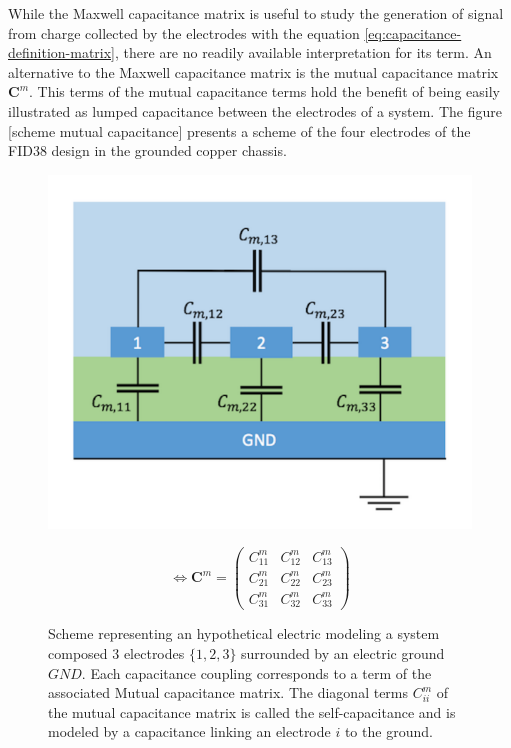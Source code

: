 While the Maxwell capacitance matrix is useful to study the generation of signal from charge collected by the electrodes with the equation \ref{eq:capacitance-definition-matrix}, there are no readily available interpretation for its term. An alternative to the Maxwell capacitance matrix is the mutual capacitance matrix $\bm{C}^m$. This terms of the mutual capacitance terms hold the benefit of being easily illustrated as lumped capacitance between the electrodes of a system. The figure [scheme mutual capacitance] presents a scheme of the four electrodes of the FID38 design in the grounded copper chassis.

\begin{figure}
\begin{minipage}{0.58\textwidth}
    \includegraphics[width=\linewidth]{Figures/Electrodes/lumped_capacitance_scheme_better.png}
\end{minipage}
\begin{minipage}{0.38\textwidth}
	\begin{equation*}
	\Leftrightarrow
	\bm{C}^m = 
	\begin{pmatrix}
	C_{11}^m & C_{12}^m & C_{13}^m \\ 
	C_{21}^m & C_{22}^m & C_{23}^m \\
	C_{31}^m & C_{32}^m & C_{33}^m
	\end{pmatrix}
	\end{equation*}
\end{minipage}
\caption{Scheme representing an hypothetical electric modeling a system composed 3 electrodes $\{1,2,3\}$ surrounded by an electric ground $GND$. Each capacitance coupling corresponds to a term of the associated Mutual capacitance matrix. The diagonal terms $C_{ii}^m$ of the mutual capacitance matrix is called the self-capacitance and is modeled by a capacitance linking an electrode $i$ to the ground.}
\label{fig:lumped-capacitance}
\end{figure}

